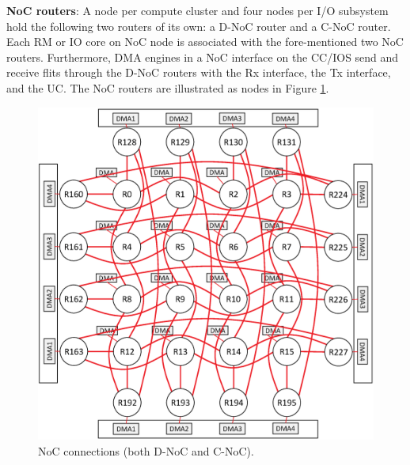 \documentclass[conference,compsoc]{IEEEtran}
\begin{document}
\textbf{NoC routers}:
A node per compute cluster and four nodes per I/O subsystem hold the following two routers of its own: a D-NoC router and a C-NoC router.
Each RM or IO core on NoC node is associated with the fore-mentioned two NoC routers.
Furthermore, DMA engines in a NoC interface on the CC/IOS send and receive flits through the D-NoC routers with the Rx interface, the Tx interface, and the UC.
The NoC routers are illustrated as nodes in Figure \ref{fig:noc_map}.

\begin{figure}[t]
  \centering
  \includegraphics[width=0.65\linewidth]{../figure/noc_map.eps}
  \vspace{-3mm}
  \caption{\label{fig:noc_map}
    NoC connections (both D-NoC and C-NoC).}
  \vspace{-3mm}
\end{figure}
\end{document}
